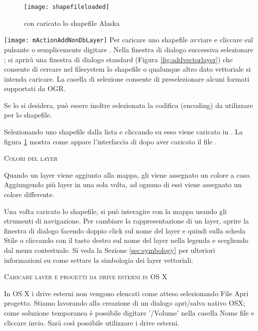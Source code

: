 \begin{figure}[ht]
   \centering
   \texttt{[image: shapefileloaded]}
   \caption{\qg con caricato lo shapefile Alaska \wincaption}\label{fig:loadedshapefile}
\end{figure}

\texttt{[image: mActionAddNonDbLayer]} 
Per caricare uno shapefile avviare \qg e cliccare sul pulsante
 o semplicemente digitare .
Nella finestra di dialogo successiva selezionare ; si aprirà 
una finestra di dialogo standard (Figura \ref{fig:addvectorlayer}) che 
consente di cercare nel filesystem lo shapefile o qualunque altro dato vettoriale 
si intenda caricare. 
La casella di selezione  consente di
preselezionare alcuni formati supportati da OGR.

Se lo si desidera, può essere inoltre selezionata la codifica (encoding) da utilizzare
per lo shapefile.

Selezionando uno shapefile dalla lista e cliccando su  esso viene
caricato in \qg. La figura \ref{fig:loadedshapefile} mostra come appare
l'interfaccia di \qg dopo aver caricato il file .

\begin{Tip}\caption{\textsc{Colori del layer}}
Quando un layer viene aggiunto alla mappa, gli viene assegnato un
colore a caso. Aggiungendo più layer in una sola volta, ad ognuno di essi
viene assegnato un colore differente.
\end{Tip}

Una volta caricato lo shapefile, si può interagire con la mappa usando 
gli strumenti di navigazione.
Per cambiare la rappresentazione di un layer, aprire la finestra di dialogo
 facendo doppio click sul nome del layer e quindi sulla
scheda Stile o cliccando con il tasto destro sul nome del layer nella legenda 
e scegliendo  dal menu contestuale. Si veda la Sezione
\ref{sec:symbology} per ulteriori informazioni su come settare la simbologia
dei layer vettoriali.

\begin{Tip}\caption{\textsc{Caricare layer e progetti da drive esterni in OS X}}
In OS X i drive esterni non vengono elencati come atteso selezionando File 
\arrow Apri progetto. Stiamo lavorando alla creazione di un dialogo apri/salva 
nativo OSX; come soluzione temporanea è possibile digitare '/Volume' nella 
casella Nome file e cliccare invio. Sarà così possibile utilizzare i drive esterni.
\end{Tip}

